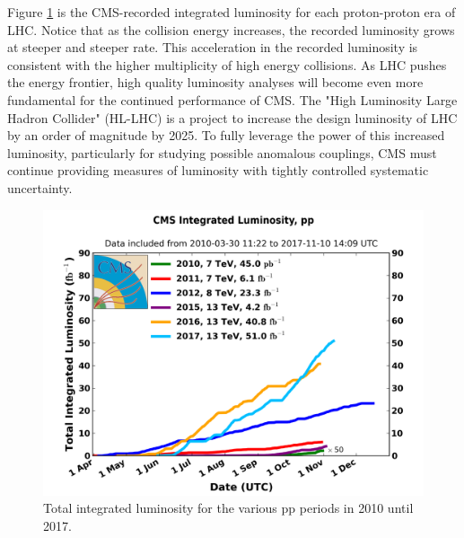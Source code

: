 Figure \ref{fig:lumiCMSEra} is the CMS-recorded integrated luminosity for each proton-proton era of LHC. Notice that as the collision energy increases, the recorded luminosity grows at steeper and steeper rate. This acceleration in the recorded luminosity is consistent with the higher multiplicity of high energy collisions. As LHC pushes the energy frontier, high quality luminosity analyses will become even more fundamental for the continued performance of CMS. The "High Luminosity Large Hadron Collider" (HL-LHC) is a project to increase the design luminosity of LHC by an order of magnitude by 2025. To fully leverage the power of this increased luminosity, particularly for studying possible anomalous couplings, CMS must continue providing measures of luminosity with tightly controlled systematic uncertainty. 

\begin{figure}[h!]
\begin{centering}
\includegraphics[width=5in]{Chapter4/importfigs/int_lumi_cumulative_pp_2.png}
\par\end{centering}
\caption{Total integrated luminosity for the various pp periods in 2010 until 2017. \label{fig:lumiCMSEra}}
\end{figure}